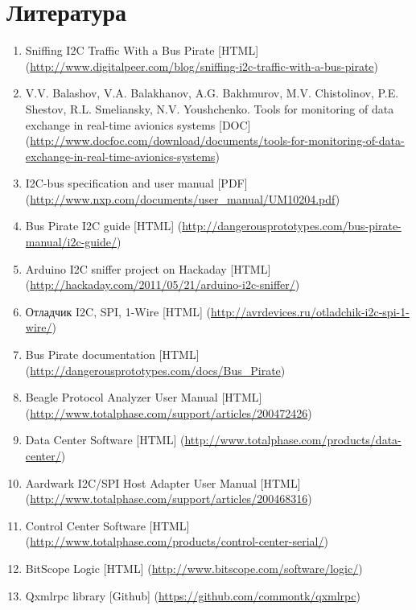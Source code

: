 \section{Литература}

\begin{enumerate}
 \sloppy
 \item \label{i2c_sniffing} Sniffing I2C Traffic With a Bus Pirate [HTML] (\url{http://www.digitalpeer.com/blog/sniffing-i2c-traffic-with-a-bus-pirate})
 \item \label{monitoring_tools} V.V. Balashov, V.A. Balakhanov, A.G. Bakhmurov, M.V. Chistolinov, 
P.E. Shestov, R.L. Smeliansky, N.V. Youshchenko. Tools for monitoring of data exchange in real-time avionics systems [DOC] (\url{http://www.docfoc.com/download/documents/tools-for-monitoring-of-data-exchange-in-real-time-avionics-systems})
 \item \label{i2c_protocol_spec} I2C-bus specification and user manual [PDF] (\url{http://www.nxp.com/documents/user_manual/UM10204.pdf})
 \item \label{buspirate_i2c} Bus Pirate I2C guide [HTML] (\url{http://dangerousprototypes.com/bus-pirate-manual/i2c-guide/})
 \item \label{arduino-i2c-sniffer} Arduino I2C sniffer project on Hackaday [HTML] (\url{http://hackaday.com/2011/05/21/arduino-i2c-sniffer/})
 \item \label{i2c-spi-1w-debugger} Отладчик I2C, SPI, 1-Wire [HTML] (\url{http://avrdevices.ru/otladchik-i2c-spi-1-wire/})
 \item \label{buspirate_descr} Bus Pirate documentation [HTML] (\url{http://dangerousprototypes.com/docs/Bus_Pirate})
 \item \label{beagle_protocol_analyzer} Beagle Protocol Analyzer User Manual [HTML] (\url{http://www.totalphase.com/support/articles/200472426})
 \item \label{tp_data_center} Data Center Software [HTML] (\url{http://www.totalphase.com/products/data-center/})
 \item \label{aardwark_adapter} Aardwark I2C/SPI Host Adapter User Manual [HTML] (\url{http://www.totalphase.com/support/articles/200468316})
 \item \label{tp_control_center} Control Center Software [HTML] (\url{http://www.totalphase.com/products/control-center-serial/})
 \item \label{bitscope_logic} BitScope Logic [HTML] (\url{http://www.bitscope.com/software/logic/})
 \item \label{qxmlrpc} Qxmlrpc library [Github] (\url{https://github.com/commontk/qxmlrpc})

\end{enumerate}

